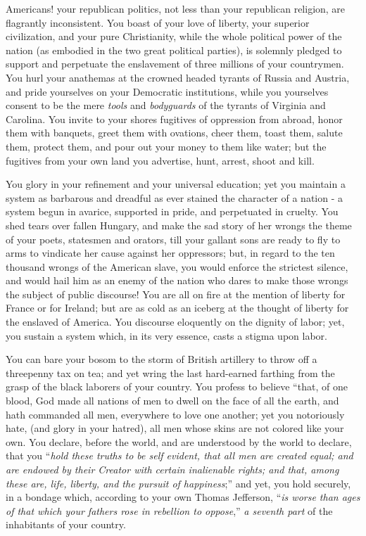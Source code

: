 Americans! your republican politics, not less than your republican religion, are flagrantly inconsistent. You boast of your love of liberty, your superior civilization, and your pure Christianity, while the whole political power of the nation (as embodied in the two great political parties), is solemnly pledged to support and perpetuate the enslavement of three millions of your countrymen. You hurl your anathemas at the crowned headed tyrants of Russia and Austria, and pride yourselves on your Democratic institutions, while you yourselves consent to be the mere \textit{tools} and \textit{bodyguards} of the tyrants of Virginia and Carolina. You invite to your shores fugitives of oppression from abroad, honor them with banquets, greet them with ovations, cheer them, toast them, salute them, protect them, and pour out your money to them like water; but the fugitives from your own land you advertise, hunt, arrest, shoot and kill.\par

You glory in your refinement and your universal education; yet you maintain a system as barbarous and dreadful as ever stained the character of a nation - a system begun in avarice, supported in pride, and perpetuated in cruelty. You shed tears over fallen Hungary, and make the sad story of her wrongs the theme of your poets, statesmen and orators, till your gallant sons are ready to fly to arms to vindicate her cause against her oppressors; but, in regard to the ten thousand wrongs of the American slave, you would enforce the strictest silence, and would hail him as an enemy of the nation who dares to make those wrongs the subject of public discourse! You are all on fire at the mention of liberty for France or for Ireland; but are as cold as an iceberg at the thought of liberty for the enslaved of America. You discourse eloquently on the dignity of labor; yet, you sustain a system which, in its very essence, casts a stigma upon labor.\par

You can bare your bosom to the storm of British artillery to throw off a threepenny tax on tea; and yet wring the last hard-earned farthing from the grasp of the black laborers of your country. You profess to believe “that, of one blood, God made all nations of men to dwell on the face of all the earth, and hath commanded all men, everywhere to love one another; yet you notoriously hate, (and glory in your hatred), all men whose skins are not colored like your own. You declare, before the world, and are understood by the world to declare, that you “\textit{hold these truths to be self evident, that all men are created equal; and are endowed by their Creator with certain inalienable rights; and that, among these are, life, liberty, and the pursuit of happiness};” and yet, you hold securely, in a bondage which, according to your own Thomas Jefferson, “\textit{is worse than ages of that which your fathers rose in rebellion to oppose},” \textit{a seventh part }of the inhabitants of your country.\par

